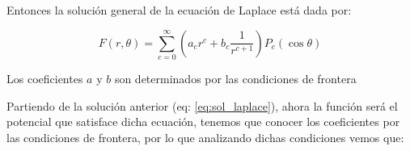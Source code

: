 \documentclass[11pt]{report}
\theoremstyle{plain}
\theoremstyle{definition}
\begin{document}
Entonces la solución general de la ecuación de Laplace está dada por:

\begin{equation}
	\label{eq:sol_laplace}
	F(r,\theta)=\sum^\infty_{c=0}\left(a_c r^c + b_c \frac{1}{r^{c+1}}\right)P_c(\cos\theta)
\end{equation}

Los coeficientes $a$ y $b$ son determinados por las condiciones de frontera


Partiendo de la solución anterior (eq: \ref{eq:sol_laplace}), ahora la función será el potencial que satisface dicha ecuación, tenemos que conocer los coeficientes por las condiciones de frontera, por lo que analizando dichas condiciones vemos que:

\end{document}
